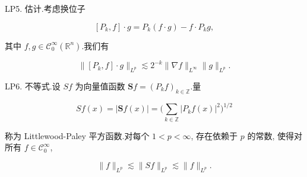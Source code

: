 \begin{theorem}
LP5. 估计.考虑换位子

\[
[P_k, f] \cdot g = P_k(f \cdot g) - f \cdot P_k g,
\]

其中 $f, g \in \mathcal{C}_0^\infty(\mathbb{R}^n)$.我们有

\[
\|[P_k, f] \cdot g\|_{L^p} \lesssim 2^{-k} \|\nabla f\|_{L^\infty} \|g\|_{L^p}.
\]

LP6. 不等式.设 $Sf$ 为向量值函数 $\mathbf{S}f = (P_k f)_{k\in\mathbb{Z}}$.量

\begin{equation}
Sf(x) = |\mathbf{S}f(x)| = \big(\sum_{k\in\mathbb{Z}} |P_k f(x)|^2\big)^{1/2}\label{eq:c6-225}
\end{equation}

称为 Littlewood-Paley 平方函数.对每个 $1 < p < \infty$, 存在依赖于 $p$ 的常数, 使得对所有 $f \in \mathcal{C}_0^\infty$,

\begin{equation}
\|f\|_{L^p} \lesssim \|Sf\|_{L^p} \lesssim \|f\|_{L^p}.\label{eq:c6-226}
\end{equation}
\end{theorem}
